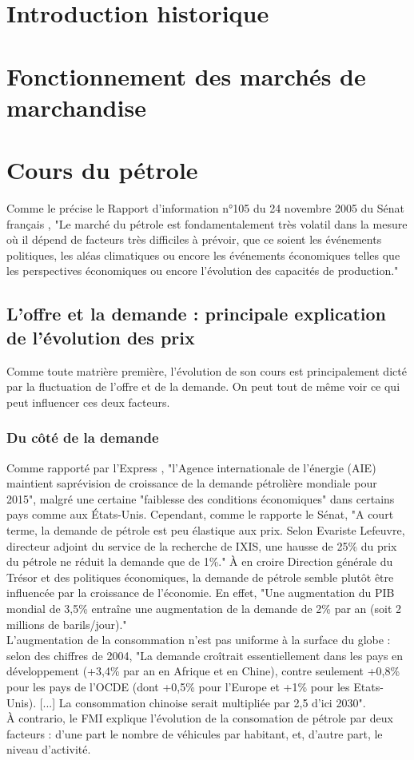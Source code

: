 \section{Introduction historique}

\section{Fonctionnement des marchés de marchandise}

\section{Cours du pétrole}
Comme le précise le Rapport d’information n°105 du 24 novembre 2005 du Sénat français \cite{rapSenat}, "Le marché du pétrole est fondamentalement très volatil dans la mesure où il dépend de facteurs très difficiles à prévoir, que ce soient les événements politiques, les aléas climatiques ou encore les événements économiques telles que les perspectives économiques ou encore l’évolution des capacités de production."
\subsection{L’offre et la demande : principale explication de l’évolution des prix}
Comme toute matrière première, l’évolution de son cours est principalement dicté par la fluctuation de l’offre et de la demande. On peut tout de même voir ce qui peut influencer ces deux facteurs.
\subsubsection{Du côté de la demande}
Comme rapporté par l’Express \cite{expressAIEPrevi}, "l’Agence internationale de l’énergie (AIE) maintient saprévision de croissance de la demande pétrolière mondiale pour 2015", malgré une certaine "faiblesse des conditions économiques" dans certains pays comme aux États-Unis. Cependant, comme le rapporte le Sénat, "A court terme, la demande de pétrole est peu élastique aux prix. Selon Evariste Lefeuvre, directeur adjoint du service de la recherche de IXIS, une hausse de 25\% du prix du pétrole ne réduit la demande que de 1\%." À en croire Direction générale du Trésor et des politiques économiques, la demande de pétrole semble plutôt être influencée par la croissance de l’économie. En effet, "Une augmentation du PIB mondial de 3,5\% entraîne une augmentation de la demande de 2\% par an (soit 2 millions de barils/jour)."\\
L’augmentation de la consommation n’est pas uniforme à la surface du globe : selon des chiffres de 2004, "La demande croîtrait essentiellement dans les pays en développement (+3,4\% par an en Afrique et en Chine), contre seulement +0,8\% pour les pays de l’OCDE (dont +0,5\% pour l’Europe et +1\% pour les Etats-Unis). [...] La consommation chinoise serait multipliée par 2,5 d’ici 2030".\\
À contrario, le FMI explique l’évolution de la consomation de pétrole par deux facteurs : d’une part le nombre de véhicules par habitant, et, d’autre part, le niveau d’activité. 

